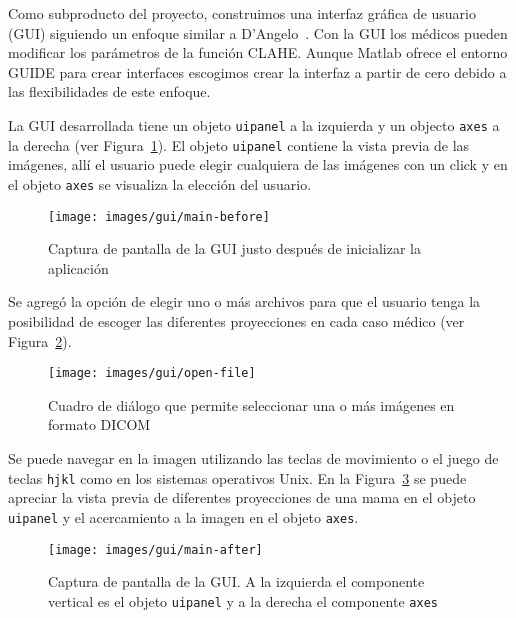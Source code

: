 Como subproducto del proyecto, construimos una interfaz gráfica de usuario
(GUI) siguiendo un enfoque similar a D'Angelo~\cite{d2007design}. Con la GUI
los médicos pueden modificar los parámetros de la función CLAHE. Aunque Matlab
ofrece el entorno GUIDE para crear interfaces escogimos crear la interfaz a
partir de cero debido a las flexibilidades de este enfoque.

La GUI desarrollada tiene un objeto \texttt{uipanel} a la izquierda y un
objecto \texttt{axes} a la derecha (ver Figura~\ref{main:before}). El objeto
\texttt{uipanel} contiene la vista previa de las imágenes, allí el usuario
puede elegir cualquiera de las imágenes con un click y en el objeto
\texttt{axes} se visualiza la elección del usuario.

\begin{figure}[h]
  \begin{center}
    {\texttt{[image: images/gui/main-before]}}
  \end{center}
  \caption[GUI: Inicio]{Captura de pantalla de la GUI justo después de inicializar la aplicación}
  \label{main:before}
\end{figure}

Se agregó la opción de elegir uno o más archivos para que el usuario tenga la
posibilidad de escoger las diferentes proyecciones en cada caso médico (ver
Figura~\ref{fig:openfile}).

\begin{figure}[h]
  \begin{center}
    {\texttt{[image: images/gui/open-file]}}
  \end{center}
  \caption[GUI: Selección de archivos]
  {Cuadro de diálogo que permite seleccionar una o más imágenes en formato DICOM}
  \label{fig:openfile}
\end{figure}

Se puede navegar en la imagen utilizando las teclas de movimiento o el juego de
teclas \texttt{hjkl} como en los sistemas operativos Unix. En la
Figura~\ref{main:after} se puede apreciar la vista previa de diferentes
proyecciones de una mama en el objeto \texttt{uipanel} y el acercamiento a la
imagen en el objeto \texttt{axes}.

\begin{figure}[h]
  \begin{center}
    {\texttt{[image: images/gui/main-after]}}
  \end{center}

  \caption[GUI: Ventana principal 2]{Captura de pantalla de la GUI. A la
  izquierda el componente vertical es el objeto \texttt{uipanel} y a la derecha
  el componente \texttt{axes}}

  \label{main:after}
\end{figure}

